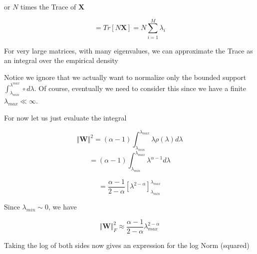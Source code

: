 or $N$ times the Trace of $\mathbf{X}$

$$=Tr[N\mathbf{X}]=N\sum_{i=1}^{M}\lambda_{i}$$


For very large matrices, with many eigenvalues, we can approximate the Trace as an integral over the empirical density

 


Notice we ignore that we actually want to normalize only the bounded support  $\int_{\lambda_{min}}^{\lambda^{max}}\circ d\lambda$.
Of course, eventually we need to consider this since we have a finite $\lambda_{max}\ll\infty$.  

For now let us just evaluate the integral

$$\Vert\mathbf{W}\Vert^{2}=(\alpha-1)\int_{\lambda_{min}}^{\lambda_{max}}\lambda\rho(\lambda)d\lambda$$
$$=(\alpha-1)\int_{\lambda_{min}}^{\lambda_{max}}\lambda^{\alpha-1}d\lambda$$

$$=\dfrac{\alpha-1}{2-\alpha}\left[\lambda^{2-\alpha}\right]^{\lambda_{max}}_{\lambda_{min}}$$

Since $\lambda_{min}\sim 0$, we have 

$$\Vert\mathbf{W}\Vert_{F}^{2}\approx\dfrac{\alpha-1}{2-\alpha}\lambda^{2-\alpha}_{max}$$

Taking the log of both sides now gives an expression for the log Norm (squared) 

